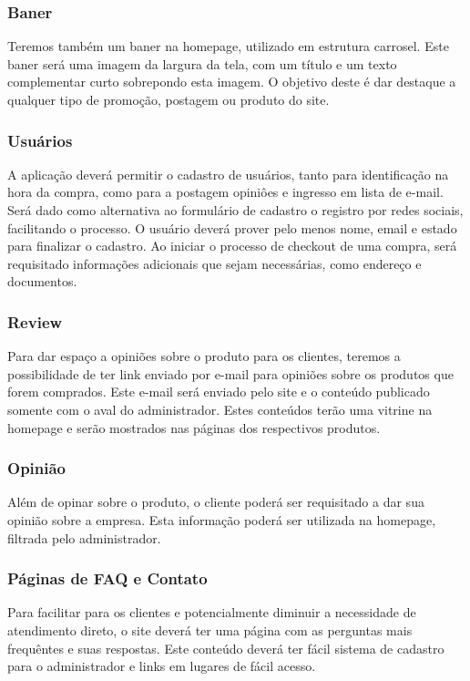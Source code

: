 \subsubsection{Baner}
Teremos também um baner na homepage, utilizado em estrutura carrosel. Este baner será uma imagem da largura da tela, com um título e um texto complementar curto sobrepondo esta imagem. O objetivo deste é dar destaque a qualquer tipo de promoção, postagem ou produto do site.

\subsubsection{Usuários}
A aplicação deverá permitir o cadastro de usuários, tanto para identificação na hora da compra, como para a postagem opiniôes e ingresso em lista de e-mail. Será dado como alternativa ao formulário de cadastro o registro por redes sociais, facilitando o processo. O usuário deverá prover pelo menos nome, email e estado para finalizar o cadastro. Ao iniciar o processo de checkout de uma compra, será requisitado informações adicionais que sejam necessárias, como endereço e documentos.

\subsubsection{Review}
Para dar espaço a opiniões sobre o produto para os clientes, teremos a possibilidade de ter link enviado por e-mail para opiniões sobre os produtos que forem comprados. Este e-mail será enviado pelo site e o conteúdo publicado somente com o aval do administrador. Estes conteúdos terão uma vitrine na homepage e serão mostrados nas páginas dos respectivos produtos.

\subsubsection{Opinião}
Além de opinar sobre o produto, o cliente poderá ser requisitado a dar sua opinião sobre a empresa. Esta informação poderá ser utilizada na homepage, filtrada pelo administrador.

\subsubsection{Páginas de FAQ e Contato}
Para facilitar para os clientes e potencialmente diminuir a necessidade de atendimento direto, o site deverá ter uma página com as perguntas mais frequêntes e suas respostas. Este conteúdo deverá ter fácil sistema de cadastro para o administrador e links em lugares de fácil acesso.

